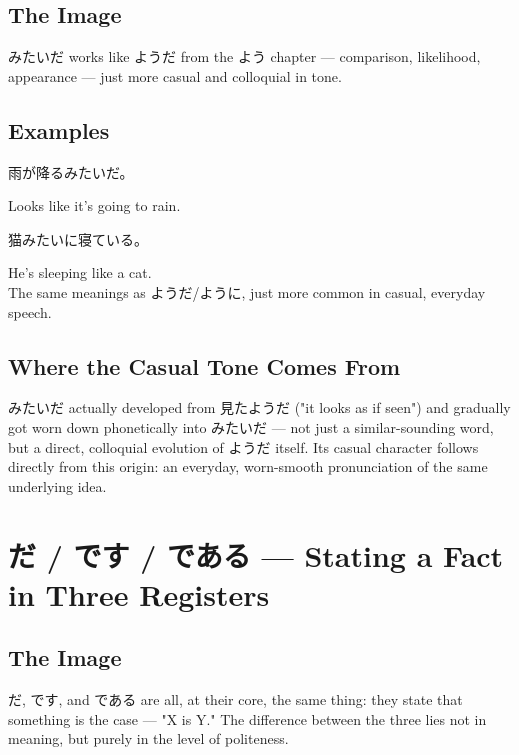 \documentclass[12pt]{book}
\begin{document}
\section*{The Image}

みたいだ works like ようだ from the よう chapter — comparison, likelihood, appearance — just more casual and colloquial in tone.

\section*{Examples}

\par\quad 雨が降るみたいだ。\\
\par\quad Looks like it's going to rain.\\

\par\quad 猫みたいに寝ている。\\
\par\quad He's sleeping like a cat.\\

The same meanings as ようだ/ように, just more common in casual, everyday speech.

\section*{Where the Casual Tone Comes From}

みたいだ actually developed from 見たようだ ("it looks as if seen") and gradually got worn down phonetically into みたいだ — not just a similar-sounding word, but a direct, colloquial evolution of ようだ itself. Its casual character follows directly from this origin: an everyday, worn-smooth pronunciation of the same underlying idea.


\chapter{だ / です / である — Stating a Fact in Three Registers}

\section*{The Image}

だ, です, and である are all, at their core, the same thing: they state that something is the case — "X is Y." The difference between the three lies not in meaning, but purely in the level of politeness.
\end{document}
